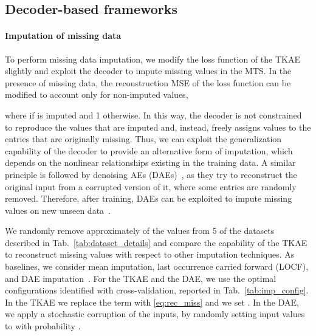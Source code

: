 \documentclass[a4paper,10pt,pdftex]{article}
\begin{document}
\subsection{Decoder-based frameworks}
\label{sec:case_stud}

\paragraph{\textbf{Imputation of missing data}} 
To perform missing data imputation, we modify the loss function of the TKAE slightly and exploit the decoder to impute missing values in the MTS.
In the presence of missing data, the reconstruction MSE of the loss function can be modified to account only for non-imputed values,

where  if  is imputed and 1 otherwise.
In this way, the decoder is not constrained to reproduce the values that are imputed and, instead, freely assigns values to the entries that are originally missing. Thus, we can exploit the generalization capability of the decoder to provide an alternative form of imputation, which depends on the nonlinear relationships existing in the training data.
A similar principle is followed by denoising AEs (DAEs)~\cite{vincent2010stacked}, as they try to reconstruct the original input from a corrupted version of it, where some entries are randomly removed.
Therefore, after training, DAEs can be exploited to impute missing values on new unseen data~\cite{beaulieu2016semi, gondara2017multiple}.

We randomly remove approximately  of the values from 5 of the datasets described in Tab.~\ref{tab:dataset_details} and compare the capability of the TKAE to reconstruct missing values with respect to other imputation techniques.
As baselines, we consider mean imputation, last occurrence carried forward (LOCF), and DAE imputation~\cite{beaulieu2017missing}.
For the TKAE and the DAE, we use the optimal configurations identified with cross-validation, reported in Tab.~\ref{tab:imp_config}.
In the TKAE we replace the  term with \eqref{eq:rec_miss} and we set .
In the DAE, we apply a stochastic corruption of the inputs, by randomly setting input values to  with probability .
\end{document}
